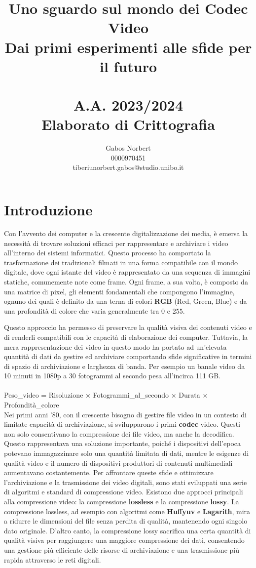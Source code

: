 \documentclass[a4paper,12pt, oneside]{article}
\title{\textbf{Uno sguardo sul mondo dei Codec Video} \\ \large Dai primi esperimenti alle sfide per il futuro \\\hphantom{A}\\ \large A.A. 2023/2024 \\ Elaborato di Crittografia}
\author{Gabos Norbert \\ 0000970451 \\ tiberiunorbert.gabos@studio.unibo.it }
\date{}
\begin{document}
\maketitle

\newpage
\tableofcontents{}
\newpage

\section{Introduzione}
Con l'avvento dei computer e la crescente digitalizzazione dei media, è emersa la necessità di
trovare soluzioni efficaci per rappresentare e archiviare i video all'interno dei sistemi
informatici. Questo processo ha comportato la trasformazione dei tradizionali filmati in una
forma compatibile con il mondo digitale, dove ogni istante del video è rappresentato da una
sequenza di immagini statiche, comunemente note come frame. Ogni frame, a sua volta, è
composto da una matrice di pixel, gli elementi fondamentali che compongono l'immagine, ognuno
dei quali è definito da una terna di colori \textbf{RGB} (Red, Green, Blue) e da una profondità
di colore che varia generalmente tra 0 e 255.

Questo approccio ha permesso di preservare la qualità visiva dei contenuti video e di renderli
compatibili con le capacità di elaborazione dei computer. Tuttavia, la mera rappresentazione
dei video in questo modo ha portato ad un'elevata quantità di dati da gestire ed archiviare
comportando sfide significative in termini di spazio di archiviazione e larghezza di banda.
Per esempio un banale video da 10 minuti in 1080p a 30 fotogrammi al secondo pesa
all'incirca 111 GB.
\noindent
\\\\Peso\_video = Risoluzione × Fotogrammi\_al\_secondo × Durata × Profondità\_colore\\

Nei primi anni '80, con il crescente bisogno di gestire file video in un contesto di limitate
capacità di archiviazione, si svilupparono i primi \textbf{codec} video. Questi non solo consentivano
la compressione dei file video, ma anche la decodifica. Questo rappresentava una soluzione
importante, poiché i dispositivi dell'epoca potevano immagazzinare solo una quantità limitata
di dati, mentre le esigenze di qualità video e il numero di dispositivi produttori di contenuti
multimediali aumentavano costantemente.
Per affrontare queste sfide e ottimizzare l'archiviazione e la trasmissione dei video
digitali, sono stati sviluppati una serie di algoritmi e standard di compressione video.
Esistono due approcci principali alla compressione video: la compressione \textbf{lossless} e
la compressione \textbf{lossy}. La compressione lossless, ad esempio con algoritmi come
\textbf{Huffyuv} e \textbf{Lagarith}, mira a ridurre le dimensioni del file senza perdita di
qualità, mantenendo ogni singolo dato originale. D'altro canto, la compressione lossy
sacrifica una certa quantità di qualità visiva per raggiungere una maggiore compressione dei
dati, consentendo una gestione più efficiente delle risorse di archiviazione e una
trasmissione più rapida attraverso le reti digitali.
\end{document}
